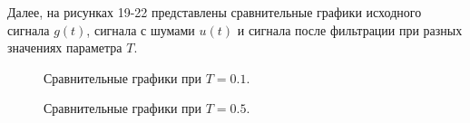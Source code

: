 \documentclass[a5paper, 10pt]{article}
\theoremstyle{definition}
\theoremstyle{plain}
\theoremstyle{remark}
\begin{document}
Далее, на рисунках 19-22 представлены сравнительные графики исходного сигнала $g(t)$, сигнала с шумами $u(t)$ и сигнала после фильтрации при разных значениях параметра $T$.

\begin{figure}[h!]
\caption{Сравнительные графики при $T = 0.1$.}
\caption{Сравнительные графики при $T = 0.5$.}
\end{figure}
\end{document}

